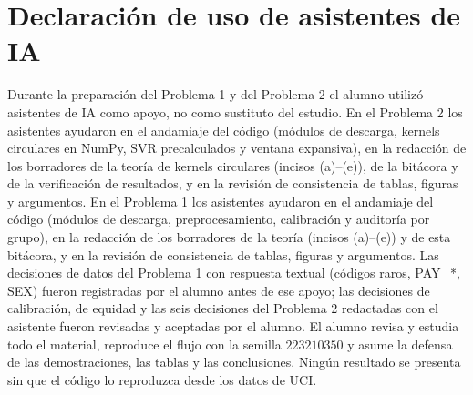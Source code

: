 \section*{Declaración de uso de asistentes de IA}

Durante la preparación del Problema 1 y del Problema 2 el alumno utilizó
asistentes de IA como apoyo, no como sustituto del estudio. En el Problema 2
los asistentes ayudaron en el andamiaje del código (módulos de descarga,
kernels circulares en NumPy, SVR precalculados y ventana expansiva), en la
redacción de los borradores de la teoría de kernels circulares (incisos
(a)--(e)), de la bitácora y de la verificación de resultados, y en la
revisión de consistencia de tablas, figuras y argumentos. En el Problema 1
los asistentes ayudaron en el andamiaje del código (módulos de descarga,
preprocesamiento, calibración y auditoría por grupo), en la redacción de los
borradores de la teoría (incisos (a)--(e)) y de esta bitácora, y en la
revisión de consistencia de tablas, figuras y argumentos. Las decisiones de
datos del Problema 1 con respuesta textual (códigos raros, PAY\_*, SEX)
fueron registradas por el alumno antes de ese apoyo; las decisiones de
calibración, de equidad y las seis decisiones del Problema 2 redactadas con
el asistente fueron revisadas y aceptadas por el alumno.
El alumno revisa y estudia todo el material, reproduce el flujo con la
semilla $223210350$ y asume la defensa de las demostraciones, las tablas y
las conclusiones. Ningún resultado se presenta sin que el código lo
reproduzca desde los datos de UCI.

